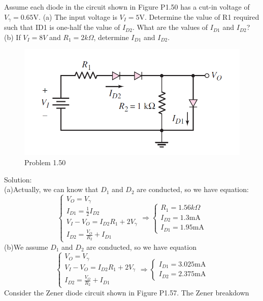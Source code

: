 \documentclass[a4paper,11pt,UTF8]{article}
\begin{document}
 Assume each diode in the circuit shown in Figure P1.50 has a cut-in voltage
of $V_\gamma = 0.65$V. (a) The input voltage is $V_I = 5$V. Determine the value of
R1 required such that ID1 is one-half the value of $I_{D2}$. What are the values
of $I_{D1}$ and $I_{D2}$? (b) If $V_I = 8V$ and $R_1 = 2k\Omega$, determine $I_{D1}$ and $I_{D2}$.\\
\begin{figure}[H] 
	\centering 
	\includegraphics[scale=0.35]{MD1_50.png}
	\caption{Problem 1.50}
\end{figure}
\noindent Solution:\\
(a)Actually, we can know that $D_1$ and $D_2$ are conducted, so we have equation:
$$\begin{cases}
	V_O=V_\gamma\\
	I_{D1}=\displaystyle\frac{1}{2}I_{D2}\\
	V_I-V_O=I_{D2}{R_1}+2V_\gamma\\
	I_{D2}=\displaystyle\frac{V_O}{R_2}+I_{D1}
\end{cases}\Rightarrow
\begin{cases}
	R_1=1.56k\Omega\\
	I_{D2}=1.3\text{mA}\\
	I_{D1}=1.95\text{mA}
\end{cases}
$$
(b)We assume $D_1$ and $D_2$ are conducted, so we have equation
$$\begin{cases}
	V_O=V_\gamma\\
	V_I-V_O=I_{D2}{R_1}+2V_\gamma\\
	I_{D2}=\displaystyle\frac{V_O}{R_2}+I_{D1}
\end{cases}\Rightarrow 
\begin{cases}
	I_{D1}=3.025\text{mA}\\
	I_{D2}=2.375\text{mA}
\end{cases}
$$
 Consider the Zener diode circuit shown in Figure P1.57. The Zener breakdown
\end{document}
